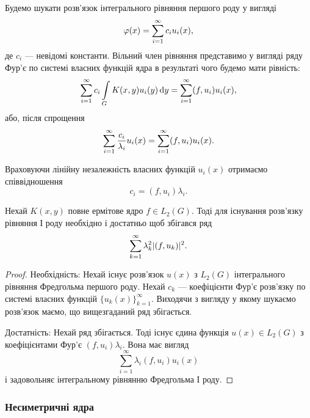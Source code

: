 Будемо шукати розв'язок інтегрального рівняння першого роду у вигляді
\begin{equation}
	\varphi(x) = \displaystyle\sum\limits_{i=1}^\infty c_i u_i(x),
\end{equation}
де $c_i$ --- невідомі константи. Вільний член рівняння представимо у вигляді ряду Фур'є по системі власних функцій ядра в результаті чого будемо мати рівність:
\begin{equation}
	\displaystyle\sum\limits_{i=1}^\infty c_i \displaystyle\int\limits_G K(x,y) u_i(y) \mathop{}\!\mathrm{d} y = \displaystyle\sum\limits_{i=1}^\infty (f,u_i)u_i(x),
\end{equation}
або, після спрощення
\begin{equation}
	\displaystyle\sum\limits_{i=1}^\infty \dfrac{c_i}{\lambda_i} u_i(x) = \displaystyle\sum\limits_{i=1}^\infty (f,u_i)u_i(x).
\end{equation}

Враховуючи лінійну незалежність власних функцій $u_i(x)$ отримаємо співвідношення 
\begin{equation}
	c_i = (f, u_i) \lambda_i.
\end{equation}

\begin{theorem} 
	Нехай $K(x, y)$ повне ермітове ядро $f \in L_2(G)$. Тоді для існування розв'язку рівняння І роду необхідно і достатньо щоб збігався ряд
	\begin{equation}
		\displaystyle\sum\limits_{k=1}^\infty \lambda_k^2 |(f, u_k)|^2.
	\end{equation}
\end{theorem}

\begin{proof}
	Необхідність: Нехай існує розв'язок $u(x)$ з $L_2(G)$ інтегрального рівняння Фредгольма першого роду. Нехай $c_k$ --- коефіцієнти Фур'є розв'язку по системі власних функцій $\{u_k(x)\}_{k=1}^\infty$. Виходячи з вигляду у якому шукаємо розв'язок маємо, що вищезгаданий ряд збігається. \medskip

	Достатність: Нехай ряд збігається. Тоді існує єдина функція $u(x) \in L_2(G)$ з коефіцієнтами Фур'є $(f,u_i)\lambda_i$. Вона має вигляд
	\begin{equation}
		\sum_{i=1}^\infty \lambda_i(f,u_i)u_i(x)
	\end{equation}
	і задовольняє інтегральному рівнянню Фредгольма І роду.
\end{proof}

\subsubsection{Несиметричні ядра}

